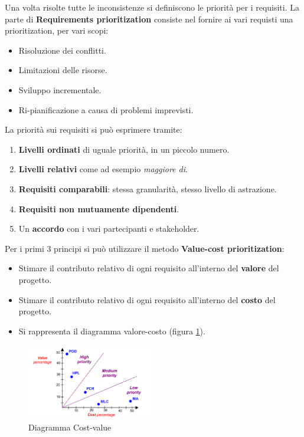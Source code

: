 Una volta risolte tutte le inconsistenze si definiscono le priorità per i requisiti.
La parte di \textbf{Requirements prioritization} consiste nel fornire ai vari
requisti una prioritization, per vari scopi:
\begin{itemize}
      \item Risoluzione dei conflitti.
      \item Limitazioni delle risorse.
      \item Sviluppo incrementale.
      \item Ri-pianificazione a causa di problemi imprevisti.
\end{itemize}
La priorità sui requisiti si può esprimere tramite:
\begin{enumerate}
      \item \textbf{Livelli ordinati} di uguale priorità, in un piccolo numero.
      \item \textbf{Livelli relativi} come ad esempio \textit{maggiore di}.
      \item \textbf{Requisiti comparabili}: stessa granularità, stesso livello di
            astrazione.
      \item \textbf{Requisiti non mutuamente dipendenti}.
      \item Un \textbf{accordo} con i vari partecipanti e stakeholder.
\end{enumerate}
Per i primi 3 principi si può utilizzare il metodo \textbf{Value-cost prioritization}:
\begin{itemize}
      \item Stimare il contributo relativo di ogni requisito all'interno del
            \textbf{valore} del progetto.
      \item Stimare il contributo relativo di ogni requisito all'interno del
            \textbf{costo} del progetto.
      \item Si rappresenta il diagramma valore-costo (figura \ref{fig:cost-value-diagram}).
\end{itemize}
\begin{figure}[!ht]
      \centering
      \includegraphics[width=0.5\textwidth]{img/requirements/cost-value-diagram.png}
      \caption{Diagramma Cost-value}
      \label{fig:cost-value-diagram}
\end{figure}
